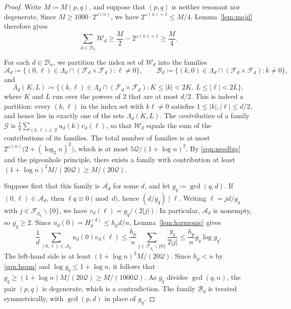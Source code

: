 \documentclass[10pt,a4paper]{amsart}
\begin{document}
\begin{proof}
Write $M\coloneq M(p,q)$, and suppose that $(p,q)$ is neither resonant nor degenerate.  Since $M\ge1000\cdot2^{\omega(n)}$, we have $2^{\omega(n)+1}\le M/4$.  Lemma~\ref{lem:majd} therefore gives
\begin{equation}
\label{eqn:needbig}
\sum_{d\in\mathcal{D}_n}\mathcal{W}_d \ge \frac M2-2^{\omega(n)+1} \ge \frac M4 .
\end{equation}

For each $d\in\mathcal{D}_n$, we partition the index set of $\mathcal{W}_d$ into the families
\[
\mathcal{A}_d\coloneq \{(0,\ell)\in\Lambda_d\cap(\mathcal{F}_d\times\mathcal{F}_d)\colon \ell\ne0\},\qquad \mathcal{B}_d\coloneq \{(k,0)\in\Lambda_d\cap(\mathcal{F}_d\times\mathcal{F}_d)\colon k\ne0\},
\]
and
\[
\Lambda_d(K,L)\coloneq \{(k,\ell)\in\Lambda_d\cap(\mathcal{F}_d\times \mathcal{F}_d)\colon K\le|k|<2K,\ L\le|\ell|<2L\},
\]
where $K$ and $L$ run over the powers of $2$ that are at most $d/2$.  This is indeed a partition: every $(k,\ell)$ in the index set with $k\ell\ne0$ satisfies $1\le|k|,|\ell|\le d/2$, and hence lies in exactly one of the sets $\Lambda_d(K,L)$.  The \emph{contribution} of a family $\mathcal{G}$ is $\frac1d\sum_{(k,\ell)\in\mathcal{G}}u_d(k)v_d(\ell)$, so that $\mathcal{W}_d$ equals the sum of the contributions of its families.  The total number of families is at most $2^{\omega(n)}\big(2+(\log_2n)^2\big)$, which is at most $5 \mathcal{Q}/(1+\log n)^2$.  By \eqref{eqn:needbig} and the pigeonhole principle, there exists a family with contribution at least $(1+\log n)^2M/(20 \mathcal{Q})\geq M/(20 \mathcal{Q})$.

Suppose first that this family is $\mathcal{A}_d$ for some $d$, and let $g_q\coloneq \gcd(q,d)$.  If $(0,\ell)\in\mathcal{A}_d$, then $\ell q\equiv0\pmod d$, hence $(d/g_q)\mid\ell$.  Writing $\ell=jd/g_q$ with $j\in\mathcal{F}_{g_q}\smallsetminus\{0\}$, we have $v_d(\ell)=g_q/(2|j|)$.  In particular, $\mathcal{A}_d$ is nonempty, so $g_q\ge2$.  Since $u_d(0)=H^{(d)}_p\le h_pd/n$, Lemma~\ref{lem:harmonic} gives
\[
\frac{1}{d}\sum_{(0,\ell)\in\mathcal{A}_d}u_d(0)v_d(\ell) \le \frac{h_p}{n}\sum_{j\in\mathcal{F}_{g_q}\smallsetminus\{0\}}\frac{g_q}{2|j|} \le \frac{h_p}{n} g_q\log g_q .
\]
The left-hand side is at least $(1+\log n)^2M/(20 \mathcal{Q})$.  Since $h_p<n$ by \eqref{eqn:hsum} and $\log g_q\le1+\log n$, it follows that $g_q\ge(1+\log n)M/(20 \mathcal{Q})\ge M/(1000 \mathcal{Q})$.  As $g_q$ divides $\gcd(q,n)$, the pair $(p,q)$ is degenerate, which is a contradiction.  The family $\mathcal{B}_d$ is treated symmetrically, with $\gcd(p,d)$ in place of $g_q$.


\end{proof}
\end{document}
